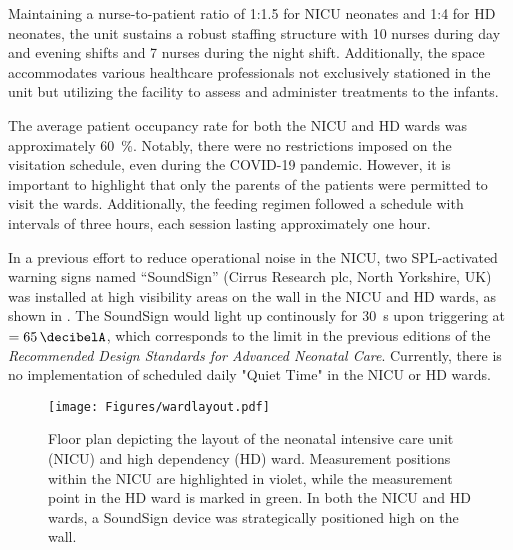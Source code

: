 
Maintaining a nurse-to-patient ratio of 1:1.5 for NICU neonates and 1:4 for HD neonates, the unit sustains a robust staffing structure with 10 nurses during day and evening shifts and 7 nurses during the night shift. Additionally, the space accommodates various healthcare professionals not exclusively stationed in the unit but utilizing the facility to assess and administer treatments to the infants.

The average patient occupancy rate for both the NICU and HD wards was approximately \SI{60}{\percent}. Notably, there were no restrictions imposed on the visitation schedule, even during the COVID-19 pandemic. However, it is important to highlight that only the parents of the patients were permitted to visit the wards. Additionally, the feeding regimen followed a schedule with intervals of three hours, each session lasting approximately one hour.

In a previous effort to reduce operational noise in the NICU, two SPL-activated warning signs named ``SoundSign'' (Cirrus Research plc, North Yorkshire, UK) was installed at high visibility areas on the wall in the NICU and HD wards, as shown in . The SoundSign would light up continously for \SI{30}{s} upon triggering at $=\dba{65}$, which corresponds to the  limit in the previous editions of the \textit{Recommended Design Standards for Advanced Neonatal Care}. Currently, there is no implementation of scheduled daily "Quiet Time"  in the NICU or HD wards.

\begin{figure*}[h]
    \centering
    \texttt{[image: Figures/wardlayout.pdf]}
    \caption{Floor plan depicting the layout of the neonatal intensive care unit (NICU) and high dependency (HD) ward. Measurement positions within the NICU are highlighted in violet, while the measurement point in the HD ward is marked in green. In both the NICU and HD wards, a SoundSign device was strategically positioned high on the wall.}
    \label{fig:wardlayout}
\end{figure*}


